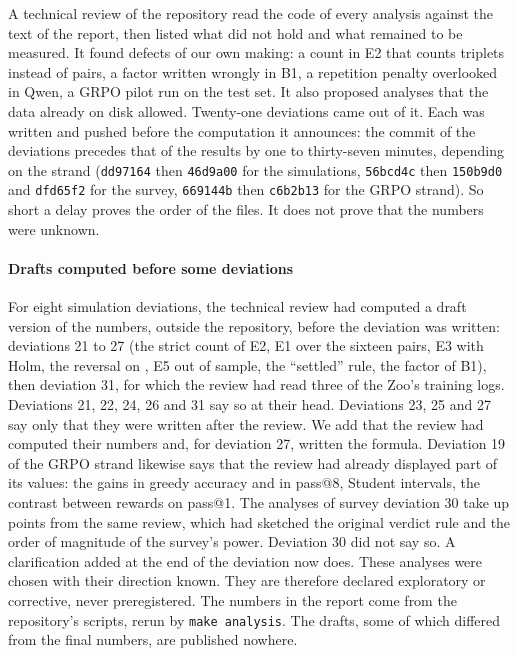 A technical review of the repository read the code of every analysis against
the text of the report, then listed what did not hold and what remained to be measured. It found
defects of our own making: a count in E2 that counts triplets instead of pairs, a factor written
wrongly in B1, a repetition penalty overlooked in Qwen, a GRPO pilot run on the test set. It also
proposed analyses that the data already on disk allowed. Twenty-one deviations came out of it. Each
was written and pushed before the computation it announces: the commit of the deviations precedes
that of the results by one to thirty-seven minutes, depending on the strand (\texttt{dd97164} then
\texttt{46d9a00} for the simulations, \texttt{56bcd4c} then \texttt{150b9d0} and \texttt{dfd65f2}
for the survey, \texttt{669144b} then \texttt{c6b2b13} for the GRPO strand). So short a delay proves
the order of the files. It does not prove that the numbers were unknown.

\paragraph{Drafts computed before some deviations} For eight simulation deviations, the technical
review had computed a draft version of the numbers, outside the repository, before the
deviation was written: deviations 21 to 27 (the strict count of E2, E1 over the sixteen pairs, E3
with Holm, the reversal on , E5 out of sample, the \enquote{settled} rule, the factor of
B1), then deviation 31, for which the review had read three of the Zoo's training logs. Deviations
21, 22, 24, 26 and 31 say so at their head. Deviations 23, 25 and 27 say only that they were written
after the review. We add that the review had computed their numbers and, for deviation 27, written
the formula. Deviation 19 of the GRPO strand likewise says that the review had already displayed part of
its values: the gains in greedy accuracy and in pass@8, Student intervals, the contrast between
rewards on pass@1. The analyses of survey deviation 30 take up points from the same review, which had
sketched the original verdict rule and the order of magnitude of the survey's power. Deviation 30
did not say so. A clarification added at the end of the deviation now does.
These analyses were chosen with their direction known. They are therefore declared exploratory or
corrective, never preregistered. The numbers in the report come from the repository's scripts, rerun
by \texttt{make analysis}. The drafts, some of which differed from the final numbers, are published
nowhere.


